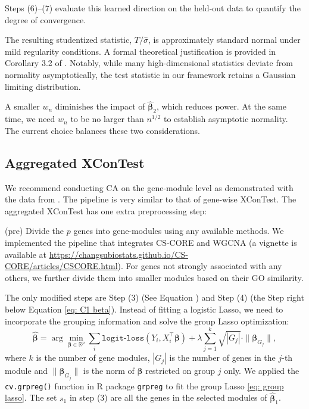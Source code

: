 \documentclass[11pt]{article}
\begin{document}
Steps (6)--(7) evaluate this learned direction on the held-out data to quantify the degree of convergence.

The resulting studentized statistic, $T / \hat{\sigma}$, is approximately standard normal under mild regularity conditions. A formal theoretical justification is provided in Corollary 3.2 of \cite{zhang2024adaptive}. Notably, while many high-dimensional statistics deviate from normality asymptotically, the test statistic in our framework retains a Gaussian limiting distribution.

A smaller $w_n$ diminishes the impact of $\widehat{\boldsymbol{\beta}}_2$, which reduces power. At the same time, we need $w_n$ to be no larger than $n^{1/2}$ to establish asymptotic normality. The current choice balances these two considerations.


\subsection*{Aggregated XConTest}

We recommend conducting CA on the gene-module level as demonstrated with the data from \cite{yao2024scalable}. The pipeline is very similar to that of gene-wise XConTest. The aggregated XConTest has one extra preprocessing step:

(pre) Divide the $p$ genes into gene-modules using any available methods. We implemented the pipeline that integrates CS-CORE and WGCNA (a vignette is available at \url{https://changsubiostats.github.io/CS-CORE/articles/CSCORE.html}). For genes not strongly associated with any others, we further divide them into smaller modules based on their GO similarity.

The only modified steps are Step (3) (See Equation ) and Step (4) (the Step right below Equation \ref{eq: C1 beta}). Instead of fitting a logistic Lasso, we need to incorporate the grouping information and solve the group Lasso optimization:
\begin{equation}\label{eq: group lasso}
   \widehat{\bm \beta} = \arg\min_{\bm{\beta}\in\mathbb{R}^p} \sum_{i} \texttt{logit-loss}(Y_i, X_i^\top \bm{\beta}) + \lambda \sum_{j=1}^k \sqrt{\left|G_j\right|} \cdot \|\bm{\beta}_{G_j}\|,
\end{equation}
where $k$ is the number of gene modules, $|G_j|$ is the number of genes in the $j$-th module and $\|\bm{\beta}_{G_j}\|$ is the norm of $\bm{\beta}$ restricted on group $j$ only. We applied the \texttt{cv.grpreg()} function in R package \texttt{grpreg} \cite{breheny2015group} to fit the group Lasso \eqref{eq: group lasso}. The set $s_1$ in step (3) are all the genes in the selected modules of $\widehat{\bm{\beta}}_1$.
\end{document}
